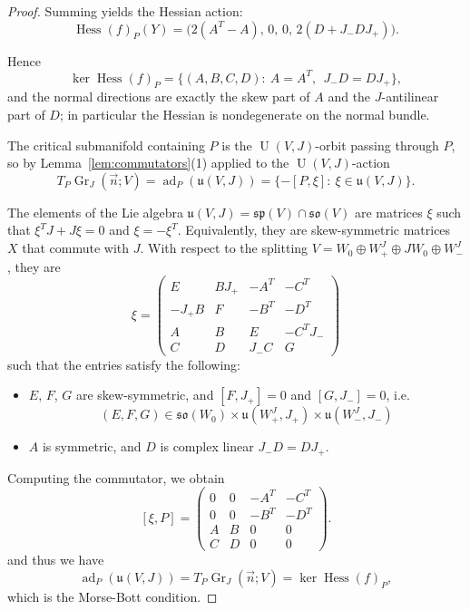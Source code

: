 \documentclass[10pt,a4paper]{amsart}
\def\Gr{\operatorname{Gr}}
\def\Hess{\operatorname{Hess}}
\def\U{\operatorname{U}}
\def\ad{\operatorname{ad}}
\def\so{\mathfrak{so}}
\def\sp{\mathfrak{sp}}
\def\u{\mathfrak{u}}
\begin{document}
\begin{proof}
Summing yields the Hessian action:
\begin{equation}\label{eq:hessian-action-correct}
\Hess(f)_P(Y) =  \big(2(A^T-A),\,0,\,0,\,2(D+J_-DJ_+)\big).
\end{equation}

Hence
\begin{equation}\label{eq:ker-hess-correct}
\ker \Hess(f)_P=\{(A,B,C,D):\ A=A^T,\ \ J_-D=DJ_+\},
\end{equation}
and the normal directions are exactly the skew part of $A$ and the $J$-antilinear part of $D$; in particular the Hessian is nondegenerate on the normal bundle.

\smallskip
The critical submanifold containing $P$ is the $\U(V,J)$-orbit passing through $P$, so by Lemma~\ref{lem:commutators}(1) applied to the $\U(V,J)$-action
\[
T_P\Gr_J(\vec n;V)=\ad_P(\u(V,J))=\{-[P,\xi]:\ \xi\in\u(V,J)\}.
\]

The elements of the Lie algebra $\u(V, J) = \sp(V) \cap \so(V)$ are matrices $\xi$ such that $\xi^TJ + J\xi = 0$ and $\xi = -\xi^T$. Equivalently, they are skew-symmetric matrices $X$ that commute with $J$. With respect to the splitting $V = W_0\oplus W_+^J\oplus JW_0\oplus W_-^J$, they are
\[ \xi = \begin{pmatrix} E & BJ_+ & -A^T & -C^T \\ -J_+ B & F & - B^T & -D^T \\ A & B & E & -C^TJ_- \\ C & D & J_-C & G \end{pmatrix} \]
such that the entries satisfy the following:
\begin{itemize}
    \item $E$, $F$, $G$ are skew-symmetric, and $[F, J_+] = 0$ and $[G, J_-] = 0$, i.e.
\[ (E, F, G) \in \so(W_0) \times \u(W_+^J, J_+) \times \u(W_-^J, J_-)\]
\item $A$ is symmetric, and $D$ is complex linear $J_-D = DJ_+$.
\end{itemize}
Computing the commutator, we obtain
\[ [\xi, P] = \begin{pmatrix} 0 & 0 & -A^T & -C^T \\ 0 & 0 & - B^T & -D^T \\ A & B & 0 & 0 \\ C & D & 0 & 0 \end{pmatrix}.\]
and thus we have
\[ \ad_P(\u(V, J)) = T_P\Gr_J(\vec{n}; V) = \ker \Hess(f)_P,\]
which is the Morse-Bott condition.
\end{proof}
\end{document}
